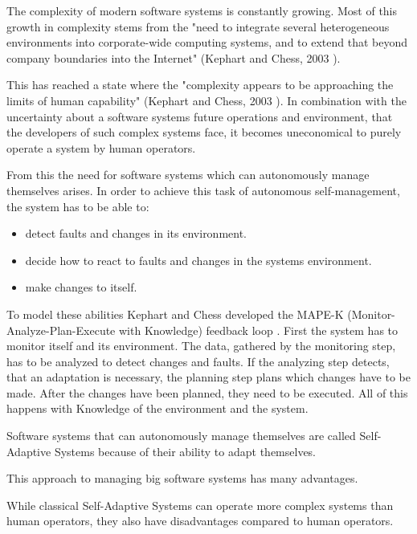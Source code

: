 The complexity of modern software systems is constantly growing.
Most of this growth in complexity stems from the 
"need to integrate several heterogeneous environments into corporate-wide computing systems, 
and to extend that beyond company boundaries into the Internet" (Kephart and Chess, 2003 \cite*{VisionOfAutonomicComputing}).
\par
This has reached a state where the 
"complexity appears to be approaching the limits of human capability" (Kephart and Chess, 2003 \cite*{VisionOfAutonomicComputing}).
In combination with the uncertainty about a software systems future operations and environment,
that the developers of such complex systems face, it becomes uneconomical to purely operate a system by human operators.
\par
From this the need for software systems which can autonomously manage themselves arises.
In order to achieve this task of autonomous self-management, the system has to be able to:
\begin{itemize}
    \item detect faults and changes in its environment.
    \item decide how to react to faults and changes in the systems environment.
    \item make changes to itself.
\end{itemize}
To model these abilities Kephart and Chess developed 
the MAPE-K (Monitor-Analyze-Plan-Execute with Knowledge) feedback loop \cite*{VisionOfAutonomicComputing}.
First the system has to monitor itself and its environment. 
The data, gathered by the monitoring step, has to be analyzed to detect changes and faults.
If the analyzing step detects, that an adaptation is necessary, 
the planning step plans which changes have to be made.
After the changes have been planned, they need to be executed.
All of this happens with Knowledge of the environment and the system.

Software systems that can autonomously manage themselves are called Self-Adaptive Systems
because of their ability to adapt themselves.

This approach to managing big software systems has many advantages.


While classical Self-Adaptive Systems can operate more complex systems than human operators,
they also have disadvantages compared to human operators.